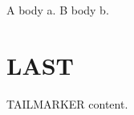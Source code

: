 \documentclass{amsart}
\begin{document}
{\lem A body a.}
{\cor B body b.}
\section{LAST}
TAILMARKER content.
\end{document}
